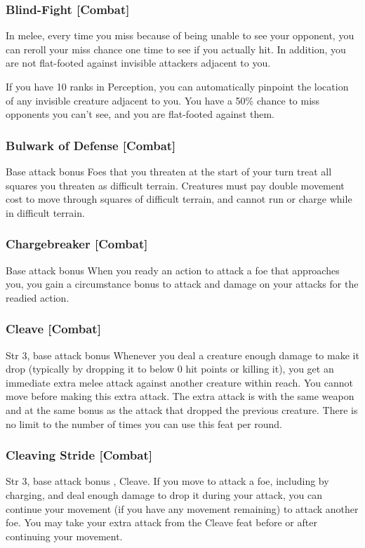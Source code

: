\subsubsection{Blind-Fight [Combat]}
 In melee, every time you miss because of being unable to see your opponent, you can reroll your miss chance one time to see if you actually hit. In addition, you are not flat-footed against invisible attackers adjacent to you.
\par If you have 10 ranks in Perception, you can automatically pinpoint the location of any invisible creature adjacent to you. 
 You have a 50\% chance to miss opponents you can't see, and you are flat-footed against them.

\subsubsection{Bulwark of Defense [Combat]}
 Base attack bonus 
 Foes that you threaten at the start of your turn treat all squares you threaten as difficult terrain. Creatures must pay double movement cost to move through squares of difficult terrain, and cannot run or charge while in difficult terrain.

\subsubsection{Chargebreaker [Combat]}
 Base attack bonus 
 When you ready an action to attack a foe that approaches you, you gain a  circumstance bonus to attack and damage on your attacks for the readied action.

\subsubsection{Cleave [Combat]}
 Str 3, base attack bonus 
 Whenever you deal a creature enough damage to make it drop (typically by dropping it to below 0 hit points or killing it), you get an immediate extra melee attack against another creature within reach. You cannot move before making this extra attack. The extra attack is with the same weapon and at the same bonus as the attack that dropped the previous creature. There is no limit to the number of times you can use this feat per round.

\subsubsection{Cleaving Stride [Combat]}
 Str 3, base attack bonus , Cleave.
 If you move to attack a foe, including by charging, and deal enough damage to drop it during your attack, you can continue your movement (if you have any movement remaining) to attack another foe. You may take your extra attack from the Cleave feat before or after continuing your movement.

